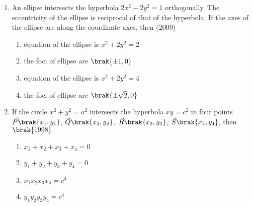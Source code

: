 \begin{enumerate}
	\hfill{}
\item An ellipse intersects the hyperbola $2x^2-2y^2=1$ orthogonally. The eccentricity of the ellipse is reciprocal of that of the hyperbola. If the axes of the ellipse are along the coordinate axes, then \hfill(2009)
		\begin{multicols}{2}
\begin{enumerate}
			\item equation of the ellipse is $x^2+2y^2=2$
			\item the foci of ellipse are $\brak{\pm1,0}$
			\item equation of the ellipse is $x^2+2y^2=4$
			\item the foci of ellipse are $\brak{\pm\sqrt{2},0}$
		\end{enumerate}
\end{multicols}

\item If the circle $x^2+y^2=a^2$ intersects the hyperbola $xy=c^2$ in four points $\vec{P}\brak{x_1, y_1}$, $\vec{Q}\brak{x_2, y_2}$, $\vec{R}\brak{x_3, y_3}$, $\vec{S}\brak{x_4, y_4}$, then
%
    \hfill$\brak{1998}$
\begin{multicols}{2}
\begin{enumerate}
    \item $x_1+x_2+x_3+x_4=0$
    \item $y_1+y_2+y_3+y_4=0$
    \item $x_1x_2x_3x_4=c^4$
    \item $y_1y_2y_3y_4=c^4$
%
\end{enumerate}
\end{multicols}
\end{enumerate}
